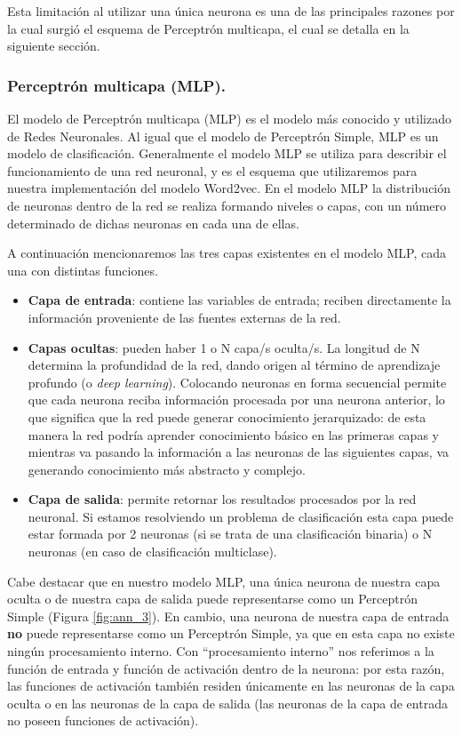 \documentclass[12pt,a4paper]{article}
\begin{document}
\begin{sloppypar}
Esta limitación al utilizar una única neurona es una de las principales razones por la cual surgió el esquema de Perceptrón multicapa, el cual se detalla en la siguiente sección.

\subsubsection{Perceptrón multicapa (MLP).}

El modelo de Perceptrón multicapa (MLP) es el modelo más conocido y utilizado de Redes Neuronales. Al igual que el modelo de Perceptrón Simple, MLP es un modelo de clasificación. Generalmente el modelo MLP se utiliza para describir el funcionamiento de una red neuronal, y es el esquema que utilizaremos para nuestra implementación del modelo Word2vec. En el modelo MLP la distribución de neuronas dentro de la red se realiza formando niveles o capas, con un número determinado de dichas neuronas en cada una de ellas. 

A continuación mencionaremos las tres capas existentes en el modelo MLP, cada una con distintas funciones.
\begin{itemize}
\item \textbf{Capa de entrada}: contiene las variables de entrada; reciben directamente la información proveniente de las fuentes externas de la red.
\item \textbf{Capas ocultas}: pueden haber 1 o N capa/s oculta/s. La longitud de N determina la profundidad de la red, dando origen al término de aprendizaje profundo (o \textit{deep learning}). Colocando neuronas en forma secuencial permite que cada neurona reciba información procesada por una neurona anterior, lo que significa que la red puede generar conocimiento jerarquizado: de esta manera la red podría aprender conocimiento básico en las primeras capas y mientras va pasando la información a las neuronas de las siguientes capas, va generando conocimiento más abstracto y complejo.
\item \textbf{Capa de salida}: permite retornar los resultados procesados por la red neuronal. Si estamos resolviendo un problema de clasificación esta capa puede estar formada por 2 neuronas (si se trata de una clasificación binaria) o N neuronas (en caso de clasificación multiclase). 
\end{itemize}

Cabe destacar que en nuestro modelo MLP, una única neurona de nuestra capa oculta o de nuestra capa de salida puede representarse como un Perceptrón Simple (Figura \ref{fig:ann_3}). En cambio, una neurona de nuestra capa de  entrada \textbf{no} puede representarse como un Perceptrón Simple, ya que en esta capa no existe ningún procesamiento interno. Con “procesamiento interno” nos referimos a la función de entrada y función de activación dentro de la neurona: por esta razón, las funciones de activación también residen únicamente en las neuronas de la capa oculta o en las neuronas de la capa de salida (las neuronas de la capa de entrada no poseen funciones de activación). 


\end{sloppypar}
\end{document}

